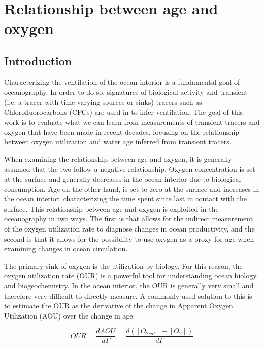\graphicspath{{figures/chapter-oxygen/}}

\chapter{Relationship between age and oxygen}
\label{cha:oxygen}

\section{Introduction}
Characterizing the ventilation of the ocean interior is a fundamental goal of
oceanography. In order to do so, signatures of biological activity and transient
(i.e. a tracer with time-varying sources or sinks) tracers such as Chlorofluorocarbons
(CFCs) are used in to infer ventilation. The goal of this work is to evaluate
what we can learn from measurements of transient tracers and oxygen that have been
made in recent decades, focusing on the relationship between oxygen utilization
and water age inferred from transient tracers.

When examining the relationship between age and oxygen, it is generally assumed
that the two follow a negative relationship. Oxygen concentration is set at the
surface and generally decreases in the ocean interior due to biological
consumption. Age on the other hand, is set to zero at the surface and increases
in the ocean interior, characterizing the time spent since last in contact with
the surface. This relationship between age and oxygen is exploited in the
oceanography in two ways. The first is that allows for the indirect measurement
of the oxygen utilization rate to diagnose changes in ocean productivity, and
the second is that it allows for the possibility to use oxygen as a proxy for
age when examining changes in ocean circulation.

The primary sink of oxygen is the utilization by biology. For this reason, the
oxygen utilization rate (OUR) is a powerful tool for understanding ocean biology
and biogeochemistry. In the ocean interior, the OUR is generally very small and
therefore very difficult to directly measure. A commonly used solution to this is
to estimate the OUR as the derivative of the change in Apparent Oxygen Utilization
(AOU) over the change in age:

\begin{equation}
  OUR = \frac{dAOU}{d\Gamma} = \frac{d([O_{2 sat}] - [O_2])}{d\Gamma}
\end{equation}

